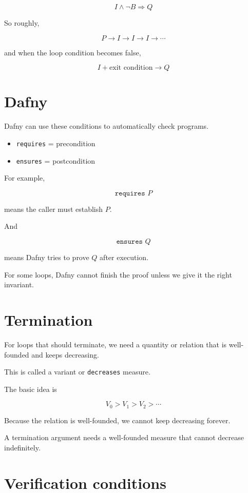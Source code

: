 \documentclass[11pt]{book}
\begin{document}
\[
I\land\neg B\Rightarrow Q
\]

So roughly,

\[
P
\rightarrow I
\rightarrow I
\rightarrow I
\rightarrow \cdots
\]

and when the loop condition becomes false,

\[
I+\text{exit condition}\rightarrow Q
\]

\section{Dafny}

Dafny can use these conditions to automatically
check programs.

\begin{itemize}
    \item \texttt{requires} = precondition
    \item \texttt{ensures} = postcondition
\end{itemize}

For example,

\[
\texttt{requires } P
\]

means the caller must establish $P$.

And

\[
\texttt{ensures } Q
\]

means Dafny tries to prove $Q$ after execution.

For some loops, Dafny cannot finish the proof unless
we give it the right invariant.

\section{Termination}

For loops that should terminate, we need a quantity or
relation that is well-founded and keeps decreasing.

This is called a variant or \texttt{decreases} measure.

The basic idea is

\[
V_0 > V_1 > V_2 > \cdots
\]

Because the relation is well-founded, we cannot keep
decreasing forever.

\begin{ppkey}
A termination argument needs a well-founded measure that
cannot decrease indefinitely.
\end{ppkey}

\section{Verification conditions}
\end{document}

